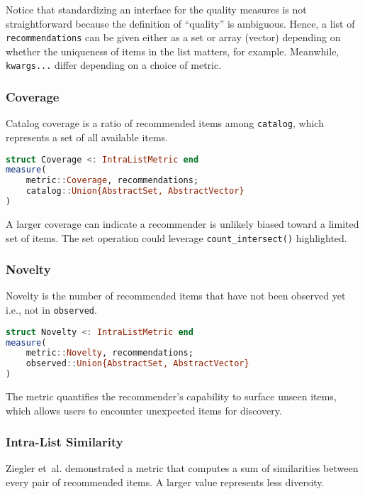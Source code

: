 Notice that standardizing an interface for the quality measures is not straightforward because the definition of ``quality'' is ambiguous. Hence, a list of \texttt{recommendations} can be given either as a set or array (vector) depending on whether the uniqueness of items in the list matters, for example. Meanwhile, \texttt{kwargs...} differ depending on a choice of metric.

\subsubsection{Coverage}

Catalog coverage is a ratio of recommended items among \texttt{catalog}, which represents a set of all available items.

\begin{lstlisting}[language = Julia]
struct Coverage <: IntraListMetric end
measure(
    metric::Coverage, recommendations;
    catalog::Union{AbstractSet, AbstractVector}
)
\end{lstlisting}

A larger coverage can indicate a recommender is unlikely biased toward a limited set of items. The set operation could leverage \texttt{count\_intersect()}  highlighted.

\subsubsection{Novelty}

Novelty is the number of recommended items that have not been observed yet i.e., not in \texttt{observed}.

\begin{lstlisting}[language = Julia]
struct Novelty <: IntraListMetric end
measure(
    metric::Novelty, recommendations;
    observed::Union{AbstractSet, AbstractVector}
)
\end{lstlisting}

The metric quantifies the recommender's capability to surface unseen items, which allows users to encounter unexpected items for discovery.

\subsubsection{Intra-List Similarity}

Ziegler et~al. \cite{ziegler2005improving} demonstrated a metric that computes a sum of similarities between every pair of recommended items. A larger value represents less diversity.

